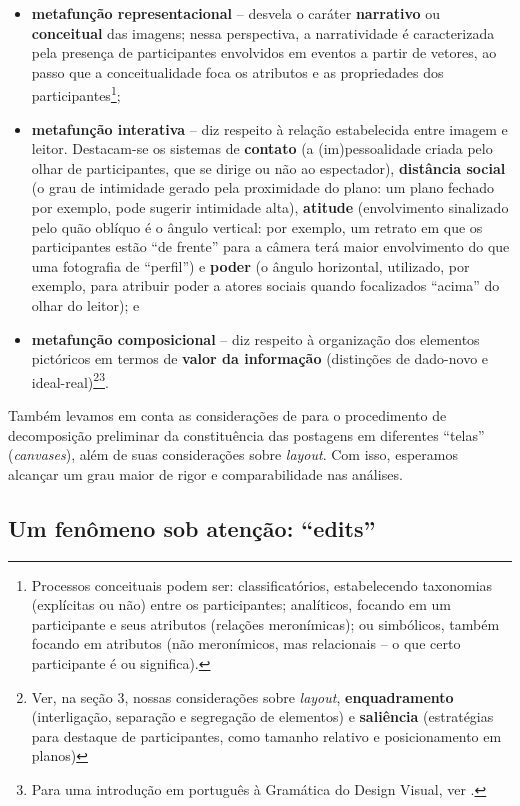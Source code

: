 \documentclass{textolivre-html}
\begin{document}
\begin{itemize}
\item \textbf{metafunção representacional} – desvela o caráter \textbf{narrativo} ou \textbf{conceitual} das imagens; nessa perspectiva, a narratividade é caracterizada pela presença de participantes envolvidos em eventos a partir de vetores, ao passo que a conceitualidade foca os atributos e as propriedades dos participantes\footnote{Processos conceituais podem ser: classificatórios, estabelecendo taxonomias (explícitas ou não) entre os participantes; analíticos, focando em um participante e seus atributos (relações meronímicas); ou simbólicos, também focando em atributos (não meronímicos, mas relacionais – o que certo participante é ou significa).};
\item \textbf{metafunção interativa} – diz respeito à relação estabelecida entre imagem e leitor.  Destacam-se os sistemas de \textbf{contato} (a (im)pessoalidade criada pelo olhar de participantes, que se dirige ou não ao espectador), \textbf{distância social} (o grau de intimidade gerado pela proximidade do plano: um plano fechado por exemplo, pode sugerir intimidade alta), \textbf{atitude} (envolvimento sinalizado pelo quão oblíquo é o ângulo vertical: por exemplo, um retrato em que os participantes estão “de frente” para a câmera terá maior envolvimento do que uma fotografia de “perfil”) e \textbf{poder} (o ângulo horizontal, utilizado, por exemplo, para atribuir poder a atores sociais quando focalizados “acima” do olhar do leitor); e
\item \textbf{metafunção composicional} – diz respeito à organização dos elementos pictóricos em termos de \textbf{valor da informação} (distinções de dado-novo e ideal-real)\footnote{Ver, na seção 3, nossas considerações sobre \textit{layout}, \textbf{enquadramento} (interligação, separação e segregação de elementos) e \textbf{saliência} (estratégias para destaque de participantes, como tamanho relativo e posicionamento em planos)}\footnote{Para uma introdução em português à Gramática do Design Visual, ver \textcite{nascimento2011}.}.
\end{itemize}

Também levamos em conta as considerações de \textcite{bateman2008,bateman2017} para o procedimento de decomposição preliminar da constituência das postagens em diferentes “telas” (\textit{canvases}), além de suas considerações sobre \textit{layout}. Com isso, esperamos alcançar um grau maior de rigor e comparabilidade nas análises.

\subsection{Um fenômeno sob atenção: “edits”}\label{sec-fenomeno}
\end{document}
